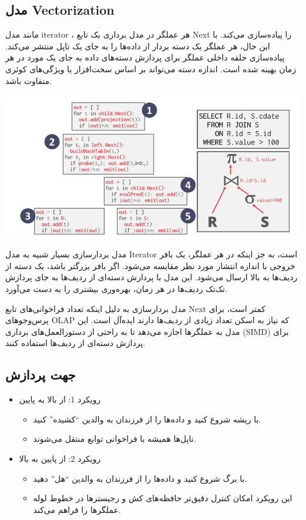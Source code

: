 \subsection{مدل Vectorization}
مانند مدل iterator ، هر عملگر در مدل برداری یک تابع Next را پیاده‌سازی می‌کند. با این حال، هر عملگر یک دسته بردار از داده‌ها را به جای یک تاپل منتشر می‌کند. پیاده‌سازی حلقه داخلی عملگر برای پردازش دسته‌های داده به جای یک مورد در هر زمان بهینه شده است. اندازه دسته می‌تواند بر اساس سخت‌افزار یا ویژگی‌های کوئری متفاوت باشد.

\qquad\qquad\qquad	\includegraphics[width=0.7\linewidth]{screenshot003}

مدل بردارسازی بسیار شبیه به مدل Iterator است، به جز اینکه در هر عملگر، یک بافر خروجی با اندازه انتشار مورد نظر مقایسه می‌شود. اگر بافر بزرگتر باشد، یک دسته از ردیف‌ها به بالا ارسال می‌شود. این مدل با پردازش دسته‌ای از ردیف‌ها به جای پردازش تک‌تک ردیف‌ها در هر زمان، بهره‌وری بیشتری را به دست می‌آورد.

مدل بردارسازی به دلیل اینکه تعداد فراخوانی‌های تابع Next کمتر است، برای پرس‌وجوهای OLAP که نیاز به اسکن تعداد زیادی از ردیف‌ها دارند ایده‌آل است. این مدل به عملگرها اجازه می‌دهد تا به راحتی از دستورالعمل‌های برداری (SIMD) برای پردازش دسته‌ای از ردیف‌ها استفاده کنند.

\subsection{جهت پردازش}
\begin{itemize}
	\item رویکرد 1: از بالا به پایین
	\begin{itemize}
		\item با ریشه شروع کنید و داده‌ها را از فرزندان به والدین ``کشیده'' کنید.
		\item تاپل‌ها همیشه با فراخوانی توابع منتقل می‌شوند.
	\end{itemize}
	\item رویکرد 2: از پایین به بالا
	\begin{itemize}
		\item با برگ شروع کنید و داده‌ها را از فرزندان به والدین ``هل'' دهید.
		\item این رویکرد امکان کنترل دقیق‌تر حافظه‌های کش و رجیسترها در خطوط لوله عملگرها را فراهم می‌کند.
	\end{itemize}
\end{itemize}

